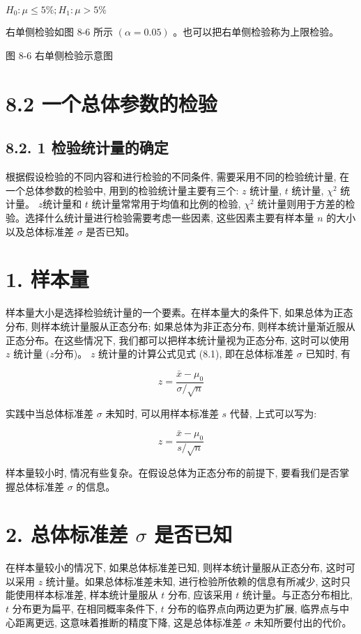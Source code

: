 \documentclass[10pt]{article}
\begin{document}
\begin{CJK*}{UTF8}{bsmi}
$H_{0}: \mu \leqslant 5 \% ; H_{1}: \mu>5 \%$

右单侧检验如图 8-6 所示 $(\alpha=0.05)$ 。也可以把右单侧检验称为上限检验。

\begin{center}
\end{center}

图 8-6 右单侧检验示意图

\section*{8.2 一个总体参数的检验}
\subsection*{8.2. 1 检验统计量的确定}
根据假设检验的不同内容和进行检验的不同条件, 需要采用不同的检验统计量, 在一个总体参数的检验中, 用到的检验统计量主要有三个: $z$ 统计量, $t$ 统计量, $\chi^{2}$ 统计量。 $z$统计量和 $t$ 统计量常常用于均值和比例的检验, $\chi^{2}$ 统计量则用于方差的检验。选择什么统计量进行检验需要考虑一些因素, 这些因素主要有样本量 $n$ 的大小以及总体标准差 $\sigma$ 是否已知。

\section*{1. 样本量}
样本量大小是选择检验统计量的一个要素。在样本量大的条件下, 如果总体为正态分布, 则样本统计量服从正态分布; 如果总体为非正态分布, 则样本统计量渐近服从正态分布。在这些情况下, 我们都可以把样本统计量视为正态分布, 这时可以使用 $z$ 统计量 $(z$分布)。 $z$ 统计量的计算公式见式 (8.1), 即在总体标准差 $\sigma$ 已知时, 有

$$
z=\frac{\bar{x}-\mu_{0}}{\sigma / \sqrt{n}}
$$

实践中当总体标准差 $\sigma$ 未知时, 可以用样本标准差 $s$ 代替, 上式可以写为:

$$
z=\frac{\bar{x}-\mu_{0}}{s / \sqrt{n}}
$$

样本量较小时, 情况有些复杂。在假设总体为正态分布的前提下, 要看我们是否掌握总体标准差 $\sigma$ 的信息。

\section*{2. 总体标准差 $\sigma$ 是否已知}
在样本量较小的情况下, 如果总体标准差已知, 则样本统计量服从正态分布, 这时可以采用 $z$ 统计量。如果总体标准差未知, 进行检验所依赖的信息有所减少, 这时只能使用样本标准差, 样本统计量服从 $t$ 分布, 应该采用 $t$ 统计量。与正态分布相比, $t$ 分布更为扁平, 在相同概率条件下, $t$ 分布的临界点向两边更为扩展, 临界点与中心距离更远, 这意味着推断的精度下降, 这是总体标准差 $\sigma$ 未知所要付出的代价。


\end{CJK*}
\end{document}
